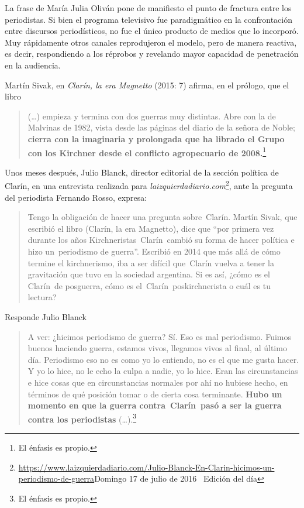 {La frase de María Julia Oliván pone de manifiesto el punto de fractura entre los periodistas. Si bien el programa televisivo fue paradigmático en la confrontación entre discursos periodísticos, no fue el único producto de medios que lo incorporó. Muy rápidamente otros canales reprodujeron el modelo, pero de manera reactiva, es decir, respondiendo a los réprobos y revelando mayor capacidad de penetración en la audiencia.

Martín Sivak, en \emph{Clarín, la era Magnetto} (2015: 7) afirma, en el prólogo, que el libro

\begin{quote}
(\ldots) empieza y termina con dos guerras muy distintas. Abre con la de Malvinas de 1982, vista desde las páginas del diario de la señora de Noble; \textbf{cierra con la imaginaria y prolongada que ha librado el Grupo con los Kirchner desde el conflicto agropecuario de 2008.}\footnote{El énfasis es propio.}
\end{quote}

Unos meses después, Julio Blanck, director editorial de la sección política de Clarín, en una entrevista realizada para \emph{laizquierdadiario.com}\footnote{\url{https://www.laizquierdadiario.com/Julio-Blanck-En-Clarin-hicimos-un-periodismo-de-guerra}Domingo 17 de julio de 2016~\textbar{} Edición del día}, ante la pregunta del periodista Fernando Rosso, expresa:

\begin{quote}
Tengo la obligación de hacer una pregunta sobre~Clarín. Martín Sivak, que escribió el libro (Clarín, la era Magnetto), dice que ``por primera vez durante los años Kirchneristas~Clarín~cambió su forma de hacer política e hizo un~periodismo de guerra''. Escribió en 2014 que más allá de cómo termine el kirchnerismo, iba a ser difícil que~Clarín vuelva a tener la gravitación que tuvo en la sociedad argentina. Si es así, ¿cómo es el Clarín~de posguerra, cómo es el~Clarín~poskirchnerista o cuál es tu lectura?
\end{quote}

Responde Julio Blanck

\begin{quote}
A ver: ¿hicimos periodismo de guerra? Sí. Eso es mal periodismo. Fuimos buenos haciendo guerra, estamos vivos, llegamos vivos al final, al último día. Periodismo eso no es como yo lo entiendo, no es el que me gusta hacer. Y yo lo hice, no le echo la culpa a nadie, yo lo hice. Eran las circunstancias e hice cosas que en circunstancias normales por ahí no hubiese hecho, en términos de qué posición tomar o de cierta cosa terminante. \textbf{Hubo un momento en que la guerra contra~Clarín~pasó a ser la guerra contra los periodistas} (\ldots).\footnote{El énfasis es propio.}
\end{quote}

}
